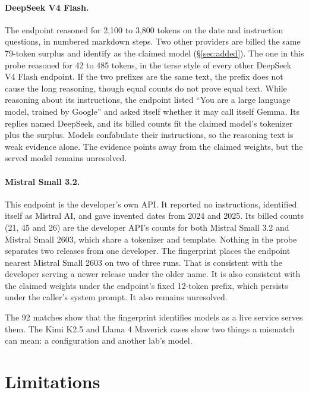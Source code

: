 \documentclass[11pt]{article}
\begin{document}
\paragraph{DeepSeek V4 Flash.} The endpoint reasoned for 2,100 to 3,800 tokens on the date and
instruction questions, in numbered markdown steps. Two other providers are billed the same 79-token
surplus and identify as the claimed model (\S\ref{sec:added}). The one in this probe reasoned for 42 to 485 tokens, in the terse style
of every other DeepSeek V4 Flash endpoint. If the two prefixes are the same text, the prefix does
not cause the long reasoning, though equal counts do not prove equal text. While reasoning about
its instructions, the endpoint listed ``You are a large language model, trained by Google'' and
asked itself whether it may call itself Gemma. Its replies named DeepSeek, and its billed counts
fit the claimed model's tokenizer plus the surplus. Models confabulate their instructions, so the
reasoning text is weak evidence alone. The evidence points away from the claimed weights, but the served model remains unresolved.

\paragraph{Mistral Small 3.2.} This endpoint is the developer's own API. It reported no
instructions, identified itself as Mistral AI, and gave invented dates from 2024 and 2025. Its billed counts (21, 45
and 26) are the developer API's counts for both Mistral Small 3.2 and Mistral Small 2603, which
share a tokenizer and template. Nothing in the probe separates two releases from one developer.
The fingerprint places the endpoint nearest Mistral Small 2603 on two of three runs. That is
consistent with the developer serving a newer release under the older name. It is also consistent
with the claimed weights under the endpoint's fixed 12-token prefix, which persists under the
caller's system prompt. It also remains unresolved.

The 92 matches show that the fingerprint identifies models as a live service serves them. The Kimi
K2.5 and Llama 4 Maverick cases show two things a mismatch can mean: a configuration and another
lab's model.

\section{Limitations}
\label{sec:limits}
\end{document}
